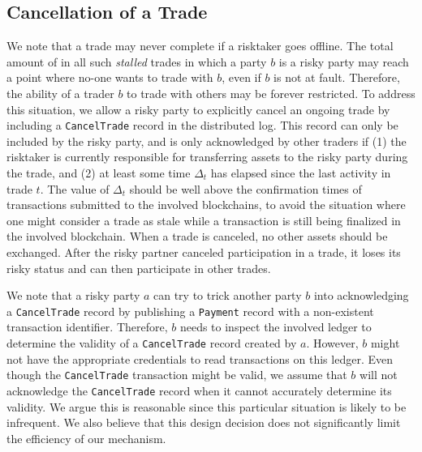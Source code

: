 

\subsection{Cancellation of a Trade}
\label{sec:trade-cancellation}
We note that a trade may never complete if a risktaker goes offline.
The total amount of \MarginalStake{} in all such \emph{stalled} trades in which a party $ b $ is a risky party may reach a point where no-one wants to trade with $ b $, even if $ b $ is not at fault.
Therefore, the ability of a trader $ b $ to trade with others may be forever restricted.
To address this situation, we allow a risky party to explicitly cancel an ongoing trade by including a \texttt{CancelTrade} record in the distributed log.
This record can only be included by the risky party, and is only acknowledged by other traders if (1) the risktaker is currently responsible for transferring assets to the risky party during the trade, and (2) at least some time $ \Delta_t $ has elapsed since the last activity in trade $ t $.
The value of $ \Delta_t $ should be well above the confirmation times of transactions submitted to the involved blockchains, to avoid the situation where one might consider a trade as stale while a transaction is still being finalized in the involved blockchain.
When a trade is canceled, no other assets should be exchanged.
After the risky partner canceled participation in a trade, it loses its risky status and can then participate in other trades.

We note that a risky party $ a $ can try to trick another party $ b $ into acknowledging a \texttt{CancelTrade} record by publishing a \texttt{Payment} record with a non-existent transaction identifier.
Therefore, $ b $ needs to inspect the involved ledger to determine the validity of a \texttt{CancelTrade} record created by $ a $.
However, $ b $ might not have the appropriate credentials to read transactions on this ledger.
Even though the \texttt{CancelTrade} transaction might be valid, we assume that $ b $ will not acknowledge the \texttt{CancelTrade} record when it cannot accurately determine its validity.
We argue this is reasonable since this particular situation is likely to be infrequent.
We also believe that this design decision does not significantly limit the efficiency of our mechanism.

